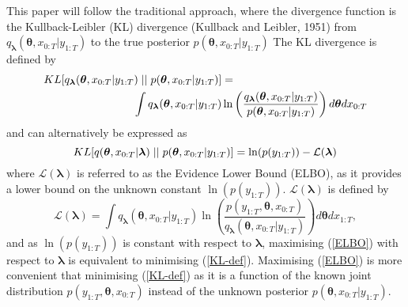 \documentclass[12pt,a4paper]{article}%
\numberwithin{equation}{section}
\begin{document}
This paper will follow the traditional approach, where the divergence function is the Kullback-Leibler (KL) divergence (Kullback and Leibler, 1951) from $q_{\boldsymbol{\lambda}}(\boldsymbol{\theta}, x_{0:T} | y_{1:T})$ to the true posterior $p(\boldsymbol{\theta}, x_{0:T} | y_{1:T})$ The KL divergence is defined by
\begin{align}
\label{KL-def}
KL[q_{\boldsymbol{\lambda}}(\boldsymbol{\theta}, x_{0:T} | y_{1:T})\hspace{.1cm}||\hspace{.1cm}p(\boldsymbol{\theta}, x_{0:T} | y_{1:T})] &= \nonumber \\
\int q_{\boldsymbol{\lambda}}(\boldsymbol{\theta}, x_{0:T} | y_{1:T}) &\ln \left( \frac{q_{\boldsymbol{\lambda}}(\boldsymbol{\theta}, x_{0:T} | y_{1:T})}{p(\boldsymbol{\theta}, x_{0:T} |y_{1:T})}\right) d\boldsymbol{\theta} dx_{0:T}
\end{align}
and can alternatively be expressed as
\begin{equation}
\label{KL-ELBO}
KL[q(\boldsymbol{\theta}, x_{0:T} | \boldsymbol{\lambda})\hspace{.1cm}||\hspace{.1cm}p(\boldsymbol{\theta}, x_{0:T} | y_{1:T})] = \ln(p(y_{1:T})) - \mathcal{L}(\boldsymbol{\lambda})
\end{equation}
where $\mathcal{L}(\boldsymbol{\lambda})$ is referred to as the Evidence Lower Bound (ELBO), as it provides a lower bound on the unknown constant $\ln(p(y_{1:T}))$.  $\mathcal{L}(\boldsymbol{\lambda})$ is defined by
\begin{equation}
\label{ELBO}
\mathcal{L}(\boldsymbol{\lambda}) = \int q_{\boldsymbol{\lambda}}(\boldsymbol{\theta}, x_{0:T} | y_{1:T}) \ln \left( \frac{p(y_{1:T},\boldsymbol{\theta}, x_{0:T})}{q_{\boldsymbol{\lambda}}(\boldsymbol{\theta}, x_{0:T} | y_{1:T})} \right) d\boldsymbol{\theta}dx_{1:T},
\end{equation}
and as $\ln(p(y_{1:T}))$ is constant with respect to $\boldsymbol{\lambda}$, maximising (\ref{ELBO}) with respect to $\boldsymbol{\lambda}$ is equivalent to minimising (\ref{KL-def}). Maximising (\ref{ELBO}) is more convenient that minimising (\ref{KL-def}) as it is a function of the known joint distribution $p(y_{1:T}, \boldsymbol{\theta}, x_{0:T})$ instead of the unknown posterior $p(\boldsymbol{\theta}, x_{0:T} | y_{1:T})$.
\end{document}
